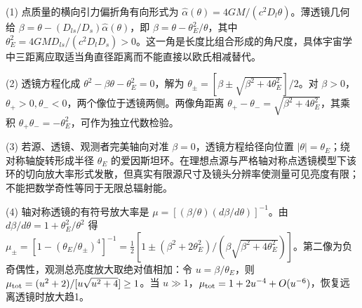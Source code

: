 (1) 点质量的横向引力偏折角有向形式为 \(\hat\alpha(\theta)=4GM/(c^2D_l\theta)\)。薄透镜几何给 \(\beta=\theta-(D_{ls}/D_s)\hat\alpha(\theta)\)，即 \(\beta=\theta-\theta_E^2/\theta\)，其中 \(\theta_E^2=4GM D_{ls}/(c^2D_lD_s)>0\)。这一角是长度比组合形成的角尺度，具体宇宙学中三距离应取适当角直径距离而不能直接以欧氏相减替代。

(2) 透镜方程化成 \(\theta^2-\beta\theta-\theta_E^2=0\)，解为 \(\theta_\pm=[\beta\pm\sqrt{\beta^2+4\theta_E^2}]/2\)。对 \(\beta>0\)，\(\theta_+>0,\theta_-<0\)，两个像位于透镜两侧。两像角距离 \(\theta_+-\theta_-=\sqrt{\beta^2+4\theta_E^2}\)，其乘积 \(\theta_+\theta_-=-\theta_E^2\)，可作为独立代数检验。

(3) 若源、透镜、观测者完美轴向对准 \(\beta=0\)，透镜方程给径向位置 \(|\theta|=\theta_E\)；绕对称轴旋转形成半径 \(\theta_E\) 的爱因斯坦环。在理想点源与严格轴对称点透镜模型下该环的切向放大率形式发散，但真实有限源尺寸及镜头分辨率使测量可见亮度有限；不能把数学奇性等同于无限总辐射能。

(4) 轴对称透镜的有符号放大率是 \(\mu=[(\beta/\theta)(d\beta/d\theta)]^{-1}\)。由 \(d\beta/d\theta=1+\theta_E^2/\theta^2\) 得 \(\mu_\pm=[1-(\theta_E/\theta_\pm)^4]^{-1}=\tfrac12[1\pm(\beta^2+2\theta_E^2)/(\beta\sqrt{\beta^2+4\theta_E^2})]\)。第二像为负奇偶性，观测总亮度放大取绝对值相加：令 \(u=\beta/\theta_E\)，则 \(\mu_{\rm tot}=(u^2+2)/[u\sqrt{u^2+4}]\ge1\)。当 \(u\gg1\)，\(\mu_{\rm tot}=1+2u^{-4}+O(u^{-6})\)，恢复远离透镜时放大趋1。

